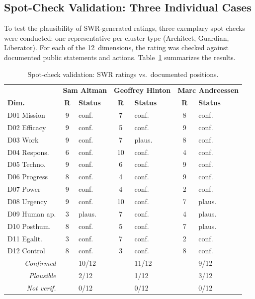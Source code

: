 \documentclass[12pt,a4paper]{article}
\begin{document}
\subsection{Spot-Check Validation: Three Individual Cases}
\label{sec:limitationen:spotchecks}

To test the plausibility of SWR-generated ratings, three exemplary spot checks were conducted: one representative per cluster type (Architect, Guardian, Liberator). For each of the 12~dimensions, the rating was checked against documented public statements and actions. Table~\ref{tab:spotchecks} summarizes the results.

\begin{table}[htbp]
  \centering
  \caption{Spot-check validation: SWR ratings vs.\ documented positions.}
  \label{tab:spotchecks}
  \footnotesize
  \begin{tabularx}{\textwidth}{l c l c l c l}
    \toprule
    & \multicolumn{2}{c}{\textbf{Sam Altman}} & \multicolumn{2}{c}{\textbf{Geoffrey Hinton}} & \multicolumn{2}{c}{\textbf{Marc Andreessen}} \\
    \textbf{Dim.} & \textbf{R} & \textbf{Status} & \textbf{R} & \textbf{Status} & \textbf{R} & \textbf{Status} \\
    \midrule
    D01 Mission  & 9 & conf. & 7 & conf. & 8 & conf. \\
    D02 Efficacy & 9 & conf. & 5 & conf. & 9 & conf. \\
    D03 Work     & 9 & conf. & 7 & plaus. & 8 & conf. \\
    D04 Respons. & 6 & conf. & 10 & conf. & 4 & conf. \\
    D05 Techno.  & 9 & conf. & 6 & conf. & 9 & conf. \\
    D06 Progress & 8 & conf. & 4 & conf. & 9 & conf. \\
    D07 Power    & 9 & conf. & 4 & conf. & 2 & conf. \\
    D08 Urgency  & 9 & conf. & 10 & conf. & 7 & plaus. \\
    D09 Human ap.& 3 & plaus. & 7 & conf. & 4 & plaus. \\
    D10 Posthum. & 8 & conf. & 5 & conf. & 7 & plaus. \\
    D11 Egalit.  & 3 & conf. & 7 & conf. & 2 & conf. \\
    D12 Control  & 8 & conf. & 3 & conf. & 8 & conf. \\
    \midrule
    \multicolumn{1}{r}{\textit{Confirmed}} & & 10/12 & & 11/12 & & 9/12 \\
    \multicolumn{1}{r}{\textit{Plausible}} & & 2/12 & & 1/12 & & 3/12 \\
    \multicolumn{1}{r}{\textit{Not verif.}} & & 0/12 & & 0/12 & & 0/12 \\
    \bottomrule
  \end{tabularx}
\end{table}
\end{document}
